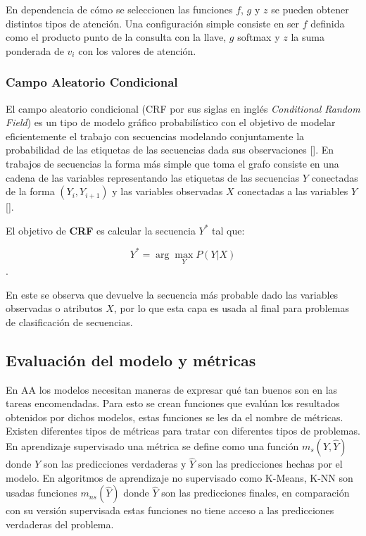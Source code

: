 En dependencia de cómo se seleccionen las funciones $f$, $g$ y $z$ se pueden obtener distintos tipos de atención.
Una configuración simple consiste en ser $f$ definida como el producto punto de la consulta con la llave,
$g$ softmax y $z$ la suma ponderada de $v_i$ con los valores de atención. 

\subsubsection{Campo Aleatorio Condicional}


El campo aleatorio condicional (CRF por sus siglas en inglés \emph{Conditional Random Field}) es un 
tipo de modelo gráfico probabilístico con el objetivo de modelar eficientemente el trabajo con secuencias 
modelando conjuntamente la probabilidad de las etiquetas de las secuencias dada sus observaciones [\cite{lafferty2001conditional}].
En trabajos de secuencias la forma más simple que toma el grafo consiste en una cadena de las variables representando
las etiquetas de las secuencias $Y$ conectadas de la forma $(Y_i, Y_{i+1})$ y las variables observadas $X$ conectadas
a las variables $Y$ [\cite{wallach2004conditional}].

El objetivo de \textbf{CRF} es calcular la secuencia $Y^*$ tal que:

\begin{equation}
	Y^* = \arg \max_Y P(Y | X)
\end{equation}\label{eq:crf}.

En este se observa que devuelve la secuencia más probable dado las variables observadas o atributos $X$,
por lo que esta capa es usada al final para problemas de clasificación de secuencias.

\subsection{Evaluación del modelo y métricas}

En AA los modelos necesitan maneras de expresar qué tan buenos son 
en las tareas encomendadas. Para esto se crean funciones que evalúan los resultados obtenidos
por dichos modelos, estas funciones se les da el nombre de métricas. Existen diferentes tipos de
métricas para tratar con diferentes tipos de problemas. En aprendizaje supervisado una métrica se
define como una función $m_s(Y, \hat{Y})$ donde $Y$ son las predicciones verdaderas y $\hat{Y}$ son las predicciones
hechas por el modelo. En algoritmos de aprendizaje no supervisado como K-Means, K-NN son usadas funciones $m_{ns}(\hat{Y})$
donde $\hat{Y}$ son las predicciones finales, en comparación con su versión supervisada estas funciones no tiene acceso
a las predicciones verdaderas del problema.

